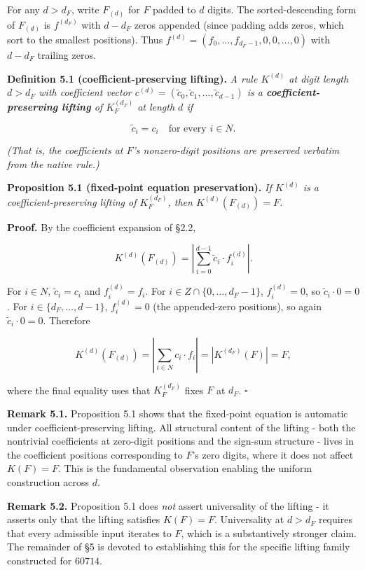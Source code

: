 \documentclass[11pt,letterpaper]{article}
\theoremstyle{paperstyle}
\theoremstyle{paperstyledef}
\theoremstyle{paperstylerem}
\begin{document}
For any \(d > d_F\), write \(F_{(d)}\) for \(F\) padded to \(d\) digits.
The sorted-descending form of \(F_{(d)}\) is \(f^{(d_{F})}\) with
\(d - d_F\) zeros appended (since padding adds zeros, which sort to the
smallest positions). Thus
\(f^{(d)} = (f_0, \ldots, f_{d_{F} - 1}, 0, 0, \ldots, 0)\) with
\(d - d_F\) trailing zeros.

\textbf{Definition 5.1 (coefficient-preserving lifting).} \emph{A rule
\(K^{(d)}\) at digit length \(d > d_F\) with coefficient vector
\(c^{(d)} = (\tilde c_0, \tilde c_1, \ldots, \tilde c_{d-1})\) is a
\textbf{coefficient-preserving lifting} of \(K_{F}^{(d_{F})}\) at length
\(d\) if}

\[\tilde c_i = c_i \quad \text{for every } i \in N.\]

\emph{(That is, the coefficients at \(F\)'s nonzero-digit positions are
preserved verbatim from the native rule.)}

\textbf{Proposition 5.1 (fixed-point equation preservation).} \emph{If
\(K^{(d)}\) is a coefficient-preserving lifting of \(K_{F}^{(d_{F})}\),
then \(K^{(d)}(F_{(d)}) = F\).}

\textbf{Proof.} By the coefficient expansion of §2.2,

\[K^{(d)}(F_{(d)}) = \left| \sum_{i = 0}^{d - 1} \tilde c_i \cdot f^{(d)}_i \right|.\]

For \(i \in N\), \(\tilde c_i = c_i\) and \(f^{(d)}_i = f_i\). For
\(i \in Z \cap \{0, \ldots, d_F - 1\}\), \(f^{(d)}_i = 0\), so
\(\tilde c_i \cdot 0 = 0\). For \(i \in \{d_F, \ldots, d - 1\}\),
\(f^{(d)}_i = 0\) (the appended-zero positions), so again
\(\tilde c_i \cdot 0 = 0\). Therefore

\[K^{(d)}(F_{(d)}) = \left| \sum_{i \in N} c_i \cdot f_i \right| = \left| K^{(d_{F})}(F) \right| = F,\]

where the final equality uses that \(K_{F}^{(d_{F})}\) fixes \(F\) at
\(d_F\). \(\square\)

\textbf{Remark 5.1.} Proposition 5.1 shows that the fixed-point equation
is automatic under coefficient-preserving lifting. All structural
content of the lifting - both the nontrivial coefficients at
zero-digit positions and the sign-sum structure - lives in the
coefficient positions corresponding to \(F\)'s zero digits, where it
does not affect \(K(F) = F\). This is the fundamental observation
enabling the uniform construction across \(d\).

\textbf{Remark 5.2.} Proposition 5.1 does \emph{not} assert universality
of the lifting - it asserts only that the lifting satisfies
\(K(F) = F\). Universality at \(d > d_F\) requires that every admissible
input iterates to \(F\), which is a substantively stronger claim. The
remainder of §5 is devoted to establishing this for the specific lifting
family constructed for \(60714\).
\end{document}
